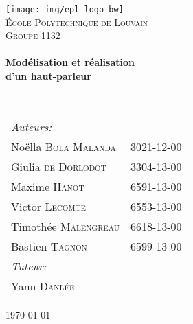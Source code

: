 \begin{titlepage}
\begin{center}

\texttt{[image: img/epl-logo-bw]}~\\[1cm]

\textsc{\LARGE École Polytechnique de Louvain}\\[1cm]

\textsc{\Large Groupe 1132}\\[0.5cm]

\HRule \\[0.3cm]
{ \huge \bfseries Modélisation et réalisation \\ d’un haut-parleur \\[0.3cm] }

\HRule \\[0.8cm]

{\large
\begin{tabu} to 0.67\linewidth {Xl}
    \emph{Auteurs:}\\
    \quad Noëlla \textsc{Bola Malanda} & 3021-12-00\\
    \quad Giulia \textsc{de Dorlodot} & 3304-13-00\\
    \quad Maxime \textsc{Hanot} & 6591-13-00\\
    \quad Victor \textsc{Lecomte} & 6553-13-00\\
    \quad Timothée \textsc{Malengreau} & 6618-13-00\\
    \quad Bastien \textsc{Tagnon} & 6599-13-00\\[.5ex]
    
    \emph{Tuteur:}\\
    \quad Yann \textsc{Danlée}\\
\end{tabu}
}

\vfill

{\large \today}

\end{center}
\end{titlepage}

